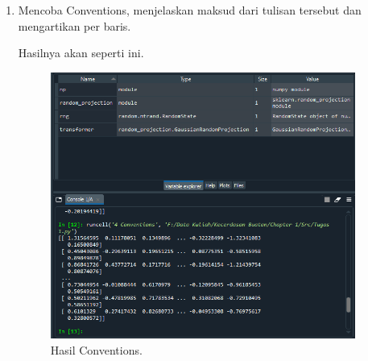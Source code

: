\begin{enumerate}
	\item Mencoba Conventions, menjelaskan maksud dari tulisan tersebut dan mengartikan per baris.
	
	
	Hasilnya akan seperti ini.
	\begin{figure}[H]
		\includegraphics[width=10cm]{figures/chapter1/praktek/hasil4.PNG}
		\centering
		\caption{Hasil Conventions.}
	\end{figure}

\end{enumerate}

